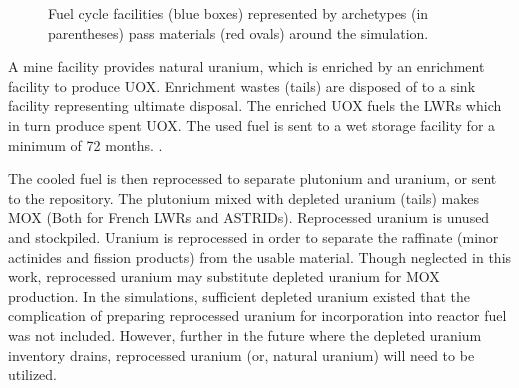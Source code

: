 \begin{figure}
{\begin{tikzpicture}[align=center, node distance = 3cm and 3cm, auto]
                \end{tikzpicture}
        
                }
                \caption{Fuel cycle facilities (blue boxes) represented by 
                        \Cyclus archetypes (in parentheses) pass materials (red 
                ovals) around the simulation.} 
                \label{diag:fc}
\end{figure}

A mine facility provides natural uranium, which is enriched by an enrichment
facility to produce \gls{UOX}. Enrichment wastes (tails) are disposed of to a 
sink facility representing ultimate disposal. The enriched \gls{UOX} fuels
the \glspl{LWR} which in turn produce spent \gls{UOX}. The used fuel
is sent to a wet storage facility for a minimum of 72 months. \cite{carre_overview_2009}.

The cooled fuel is then reprocessed to separate plutonium and uranium,
or sent to the repository.
The plutonium mixed with depleted uranium (tails) makes \gls{MOX} (Both for
French \glspl{LWR} and \glspl{ASTRID}).
Reprocessed uranium is unused and stockpiled. Uranium is reprocessed
in order to separate the raffinate (minor actinides and fission products)
from the usable material. Though neglected in this work, reprocessed
uranium may substitute depleted uranium for \gls{MOX} production. In the
simulations, sufficient depleted uranium existed that the complication of
preparing reprocessed uranium for incorporation into reactor fuel
was not included. However, further in the future where the depleted
uranium inventory drains, reprocessed uranium (or, natural uranium) will need to be utilized. 
